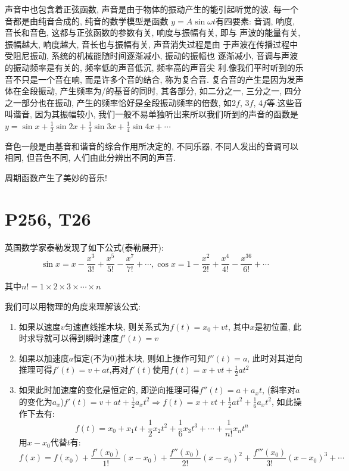 \documentclass{book}
\begin{document}
    声音中也包含着正弦函数, 声音是由于物体的振动产生的能引起听觉的波. 每一个音都是由纯音合成的, 纯音的数学模型是函数 $y=A\sin \omega t$有四要素:  音调, 响度, 音长和音色, 这都与正弦函数的参数有关, 响度与振幅有关, 即与 声波的能量有关, 振幅越大, 响度越大, 音长也与振幅有关, 声音消失过程是由 于声波在传播过程中受阻尼振动, 系统的机械能随时间逐渐减小, 振动的振幅也 逐渐减小, 音调与声波的振动频率是有关的, 频率低的声音低沉, 频率高的声音尖
    利.像我们平时听到的乐音不只是一个音在响, 而是许多个音的结合, 称为复合音.  复合音的产生是因为发声体在全段振动, 产生频率为/的基音的同时, 其各部分,  如二分之一, 三分之一, 四分之一部分也在振动, 产生的频率恰好是全段振动频率的倍数, 如2$f$, 3$f$, 4$f$等.这些音叫谐音, 因为其振幅较小, 我们一般不易单独听出来所以我们听到的声音的函数是$\displaystyle y=\sin x+\frac{1}{2}\sin 2x+\frac{1}{3}\sin 3x+\frac{1}{4}\sin 4x+\cdots$

    音色一般是由基音和谐音的综合作用所决定的, 不同乐器, 不同人发出的音调可以相同, 但音色不同, 人们由此分辨出不同的声音.

    周期函数产生了美妙的音乐!

    \section{\textcolor[rgb]{0.11,0.65,0.52}{P256, T26}}
    英国数学家泰勒发现了如下公式\textcolor[rgb]{0.38,0.11,0.2}{(泰勒展开)}:
    $$
        \sin x = x - \frac{x^3}{3!}+\frac{x^5}{5!}-\frac{x^7}{7!}+\cdots,
        \cos x = 1-\frac{x^2}{2!}+\frac{x^4}{4!}-\frac{x^36}{6!}+\cdots
    $$

    其中$n!=1\times2\times3\times\cdots\times n$

    我们可以用\textcolor[rgb]{0.75,0.17,0.22}{物理的角度}来理解该公式:

    \begin{enumerate}
        \item 如果以速度$v$匀速直线推木块, 则关系式为$f(t)=x_0+vt$, 其中$x$是初位置, 此时求导就可以得到瞬时速度$f'(t)=v$
        \item 如果以加速度$a$恒定(不为0)推木块, 则如上操作可知$f''(t)=a$, 此时对其逆向推理可得$f'(t)=v+at$,再对$\displaystyle f'(t)$使用$\displaystyle f(t) =x+vt+\frac{1}{2}at^2$
        \item 如果此时加速度的变化是恒定的, 即逆向推理可得$\displaystyle f''(t)=a+a_xt$, (斜率对$a$的变化为$a_x$)$\displaystyle f'(t)=v+at+\frac{1}{2}a_xt^2\Longrightarrow f(t)=x+vt+\frac{1}{2}at^2+\frac{1}{6}a_xt^2$, 如此操作下去有: $$f(t)=x_0+x_1t+\frac{1}{2}x_2t^2+\frac{1}{6}x_3t^3+\cdots+\frac{1}{n!}x_nt^n$$用$x-x_0$代替$t$有:$$f(x)=f(x_0)+\frac{f'(x_0)}{1!}(x-x_0)+\frac{f''(x_0)}{2!}(x-x_0)^2+\frac{f'''(x_0)}{3!}(x-x_0)^3+\cdots$$
    \end{enumerate}
\end{document}
